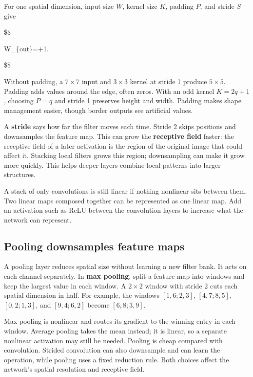 For one spatial dimension, input size \(W\), kernel size \(K\), padding \(P\), and stride \(S\) give

\$\$

W\_\{out\}=\left\lfloor{}\right\rfloor+1.

\$\$

Without padding, a \(7\times7\) input and \(3\times3\) kernel at stride 1 produce \(5\times5\). Padding adds values around the edge, often zeros. With an odd kernel \(K=2q+1\), choosing \(P=q\) and stride 1 preserves height and width. Padding makes shape management easier, though border outputs see artificial values.

A \textbf{stride} says how far the filter moves each time. Stride 2 skips positions and downsamples the feature map. This can grow the \textbf{receptive field} faster: the receptive field of a later activation is the region of the original image that could affect it. Stacking local filters grows this region; downsampling can make it grow more quickly. This helps deeper layers combine local patterns into larger structures.

A stack of only convolutions is still linear if nothing nonlinear sits between them. Two linear maps composed together can be represented as one linear map. Add an activation such as ReLU between the convolution layers to increase what the network can represent.

\subsection{Pooling downsamples feature maps}\label{04-visual-computing-ii-ch031-pooling-downsamples-feature-maps}

A pooling layer reduces spatial size without learning a new filter bank. It acts on each channel separately. In \textbf{max pooling}, split a feature map into windows and keep the largest value in each window. A \(2\times2\) window with stride 2 cuts each spatial dimension in half. For example, the windows \([1,6;2,3]\), \([4,7;8,5]\), \([0,2;1,3]\), and \([9,4;6,2]\) become \([6,8;3,9]\).

Max pooling is nonlinear and routes its gradient to the winning entry in each window. Average pooling takes the mean instead; it is linear, so a separate nonlinear activation may still be needed. Pooling is cheap compared with convolution. Strided convolution can also downsample and can learn the operation, while pooling uses a fixed reduction rule. Both choices affect the network's spatial resolution and receptive field.

